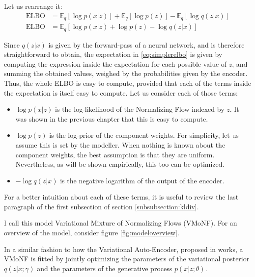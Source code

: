 Let us rearrange it:
\begin{align}
    \text{ELBO} &= \mathbb{E}_q [\log p(x|z)] + \mathbb{E}_q [\log p(z)] - \mathbb{E}_q [\log q(z|x)]
        \label{eq:threepartelbo} \\
    \text{ELBO} &= \mathbb{E}_q [\log p(x|z) + \log p(z) - \log q(z|x)] \label{eq:simplerelbo}
\end{align}

Since $q(z|x)$ is given by the forward-pass of a neural network, and is therefore
straightforward to obtain, the expectation in \ref{eq:simplerelbo} is given by
computing the expression inside the expectation for each possible value of $z$,
and summing the obtained values, weighed by the probabilities given by the encoder.
Thus, the whole ELBO is easy to compute, provided that each of the terms inside
the expectation is itself easy to compute. Let us consider each of those terms:
\begin{itemize}
    \item $\log p(x|z)$ is the log-likelihood of the Normalizing Flow indexed by $z$.
        It was shown in the previous chapter that this is easy to compute.
    \item $\log p(z)$ is the log-prior of the component weights. For simplicity,
        let us assume this is set by the modeller. When nothing is known about
        the component weights, the best assumption is that they are uniform.
        Nevertheless, as will be shown empirically, this too can be optimized.
    \item $- \log q(z|x)$ is the negative logarithm of the output of the encoder.
\end{itemize}

For a better intuition about each of these terms, it is useful to review the last
paragraph of the first subsection of section \ref{subsubsection:kldiv}.

I call this model Variational Mixture of Normalizing Flows (VMoNF). For an overview of
the model, consider figure \ref{fig:modeloverview}.

In a similar fashion to how the Variational Auto-Encoder, proposed in \cite{vaepaper}
works, a VMoNF is fitted by jointly optimizing the parameters of the variational
posterior $q(z|x; \gamma)$ and the parameters of the generative process $p(x|z; \theta)$.
